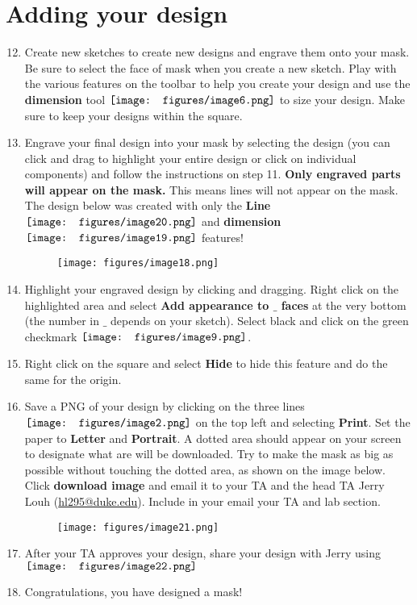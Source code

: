\documentclass[12pt]{../manual}
\begin{document}
\section{Adding your design}
\begin{enumerate}
\setcounter{enumi}{11}
\item Create new sketches to create new designs and engrave them onto your mask. Be sure to select the face of mask when you create a new sketch. Play with the various features on the toolbar to help you create your design and use the {\bf dimension} tool $\vcenter{\hbox{\texttt{[image: figures/image6.png]}}}$ to size your design. Make sure to keep your designs within the square.
\item Engrave your final design into your mask by selecting the design (you can click and drag to highlight your entire design or click on individual components) and follow the instructions on step 11. {\bf Only engraved parts will appear on the mask.} This means lines will not appear on the mask. The design below was created with only the {\bf Line} $\vcenter{\hbox{\texttt{[image: figures/image20.png]}}}$  and {\bf dimension} $\vcenter{\hbox{\texttt{[image: figures/image19.png]}}}$ features!
\begin{figure}[ht!]
\centering
\texttt{[image: figures/image18.png]}
\end{figure}
\item Highlight your engraved design by clicking and dragging. Right click on the highlighted area and select {\bf Add appearance to $\_$ faces} at the very bottom (the number in $\_$ depends on your sketch). Select black and click on the green checkmark $\vcenter{\hbox{\texttt{[image: figures/image9.png]}}}$. 
\item Right click on the square and select {\bf Hide} to hide this feature and do the same for the origin. 

\newpage
\item Save a PNG of your design by clicking on the three lines $\vcenter{\hbox{\texttt{[image: figures/image2.png]}}}$  on the top left and selecting {\bf Print}. Set the paper to {\bf Letter} and {\bf Portrait}. A dotted area should appear on your screen to designate what are will be downloaded. Try to make the mask as big as possible without touching the dotted area, as shown on the image below. Click {\bf download image} and email it to your TA and the head TA Jerry Louh (\href{hl295@duke.edu}{hl295@duke.edu}). Include in your email your TA and lab section.
\begin{figure}[ht!]
\centering
\texttt{[image: figures/image21.png]}
\end{figure}
\item After your TA approves your design, share your design with Jerry using $\vcenter{\hbox{\texttt{[image: figures/image22.png]}}}$
\item Congratulations, you have designed a mask!
\end{enumerate}
\end{document}
